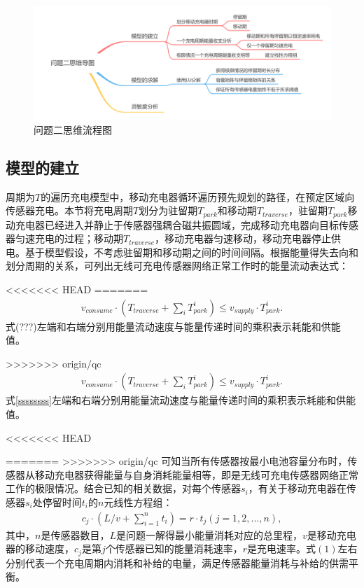 \documentclass{whutmod}
\begin{document}
\begin{table}[H]
\begin{tablenotes}
			\begin{figure}[H]
				\centering
				\includegraphics[width=\textwidth]{figures/222222.png}
				\caption{问题二思维流程图}\label{ssssct}

			\end{figure}
		
		\subsection{模型的建立}
			周期为$T$的遍历充电模型中，移动充电器循环遍历预先规划的路径，在预定区域向传感器充电。本节将充电周期$T$划分为驻留期$T_{park}$和移动期$T_{traverse}$，驻留期$T_{park}$移动充电器已经进入并静止于传感器强耦合磁共振圆域，完成移动充电器向目标传感器匀速充电的过程；移动期$T_{traverse}$，移动充电器匀速移动，移动充电器停止供电。基于模型假设，不考虑驻留期和移动期之间的时间间隔。根据能量得失去向和划分周期的关系，可列出无线可充电传感器网络正常工作时的能量流动表达式：

<<<<<<< HEAD
=======
			\begin{gather}
			v_{consume}\cdot (T_{traverse}+\sum_{i} T_{park}^i)\leq v_{supply}\cdot T_{park}^i.
			\end{gather}
			式(???)左端和右端分别用能量流动速度与能量传递时间的乘积表示耗能和供能值。

>>>>>>> origin/qc
			\begin{gather}\label{ssssssss}
			v_{consume}\cdot (T_{traverse}+\sum_{i} T_{park}^i)\leq v_{supply}\cdot T_{park}^i.
			\end{gather}
			式\ref{ssssssss}左端和右端分别用能量流动速度与能量传递时间的乘积表示耗能和供能值。

<<<<<<< HEAD
			
=======
>>>>>>> origin/qc
			可知当所有传感器按最小电池容量分布时，传感器从移动充电器获得能量与自身消耗能量相等，即是无线可充电传感器网络正常工作的极限情况。结合已知的相关数据，对每个传感器$s_i$，有关于移动充电器在传感器$s_i$处停留时间$t_i$的$n$元线性方程组：
			\begin{gather}
			c_{j} \cdot (L/v+\sum_{i=1}^{n}t_i)=r \cdot t_j (j=1,2,...,n),
			\end{gather}
			其中，$n$是传感器数目，$L$是问题一解得最小能量消耗对应的总里程，$v$是移动充电器的移动速度，$c_{j}$是第$j$个传感器已知的能量消耗速率，$r$是充电速率。式$(1)$左右分别代表一个充电周期内消耗和补给的电量，满足传感器能量消耗与补给的供需平衡。
			

\end{tablenotes}
\end{table}
\end{document}

